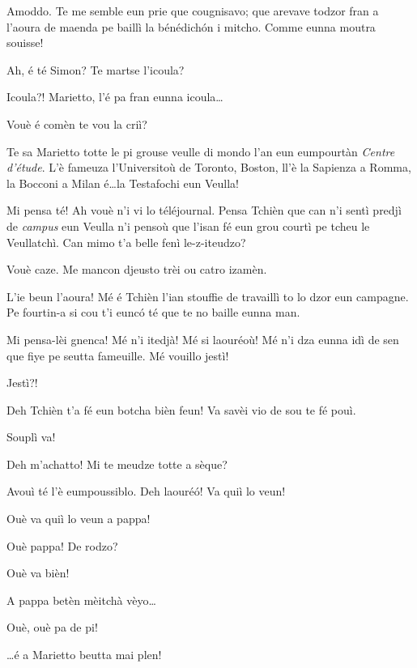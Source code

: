 \begin{drama}
\Cienspeaks Amoddo. Te me semble eun prie que cougnisavo; que arevave todzor fran a l’aoura de maenda pe baillì la bénédich\'on i mitcho. Comme eunna moutra souisse!

\Mariettospeaks Ah, é té Simon? Te martse l’icoula?

\Simonspeaks Icoula?! Marietto, l’é pa fran eunna icoula\ldots

\Mariettospeaks Vouè é comèn te vou la criì?

\Simonspeaks Te sa Marietto totte le pi grouse veulle di mondo l’an eun eumpourtàn \textit{Centre d'étude}. L’è fameuza l’Universitoù de Toronto, Boston, ll'è la Sapienza a Romma, la Bocconi a Milan é\ldots la Testafochi eun Veulla!

\Mariettospeaks Mi pensa té! Ah vouè n’i vi lo téléjournal. Pensa Tchièn que can n’i sentì predjì de \textit{campus} eun Veulla n’i pensoù que l’isan fé eun grou courtì pe tcheu le Veullatchì. Can mimo t’a belle fenì le-z-iteudzo?

\Simonspeaks Vouè caze. Me mancon djeusto trèi ou catro izamèn.

\Mariettospeaks L'ie beun l’aoura! Mé é Tchièn l'ian stouffie de travaillì to lo dzor eun campagne. Pe fourtin-a si cou t’i eunc\'o té que te no baille eunna man.

\Simonspeaks Mi pensa-lèi gnenca! Mé n'i itedjà! Mé si laouréoù! Mé n’i dza eunna idì de sen que fiye pe seutta fameuille. Mé vouillo jestì!

\Cienspeaks Jestì?!

\Mariettospeaks Deh Tchièn t’a fé eun botcha bièn feun! Va savèi vio de sou te fé pouì.

\Cienspeaks Souplì va!

\Mariettospeaks Deh m’achatto!  Mi te meudze totte a sèque?

\Cienspeaks Avouì té l’è eumpoussiblo.  Deh laouré\'o! Va quiì lo veun!

\Mariettospeaks Ouè va quiì lo veun a pappa!

\Simonspeaks {} Ouè pappa! De rodzo?

\Mariettospeaks Ouè va bièn!


\Simonspeaks A pappa betèn mèitchà vèyo\ldots

\Cienspeaks Ouè, ouè pa de pi!

\Mariettospeaks \ldots é a Marietto beutta mai plen!


\end{drama}
